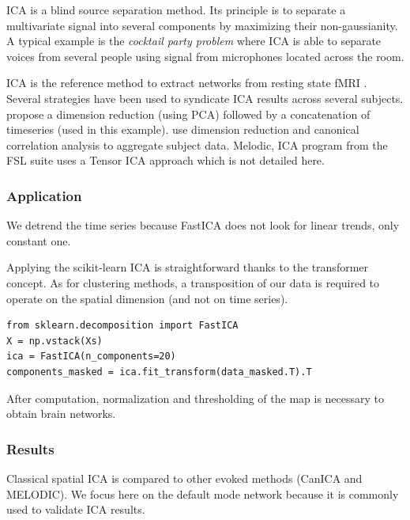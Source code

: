 \documentclass{frontiersSCNS} %
\begin{document}
ICA is a blind source separation method. Its principle is to separate a
multivariate signal into several components by maximizing their non-gaussianity.
A typical example is the \emph{cocktail party problem} where ICA is able to separate
voices from several people using signal from microphones located across the room.

ICA is the reference method to extract networks from resting state
fMRI \citep{kiviniemi2003}. Several strategies have been used to syndicate ICA
results across several subjects. \cite{calhoun2001a} propose a dimension
reduction (using PCA) followed by a concatenation of timeseries (used in this
example). \cite{varoquaux2010} use dimension reduction and canonical correlation analysis
to aggregate subject data. Melodic, ICA program from the FSL suite uses a Tensor
ICA approach which is not detailed here.

\subsubsection{Application}

We detrend the time series because
FastICA does not look for linear trends, only constant one.

Applying the scikit-learn ICA is straightforward thanks to the transformer
concept. As for clustering methods, a transposition of our data is required to
operate on the spatial dimension (and not on time series).

\begin{lstlisting}
from sklearn.decomposition import FastICA
X = np.vstack(Xs)
ica = FastICA(n_components=20)
components_masked = ica.fit_transform(data_masked.T).T
\end{lstlisting}

After computation, normalization and thresholding of the map is necessary to
obtain brain networks.

\subsubsection{Results}

Classical spatial ICA is compared to other evoked methods (CanICA and MELODIC).
We focus here on the default mode network because it is commonly used to
validate ICA results.
\end{document}
